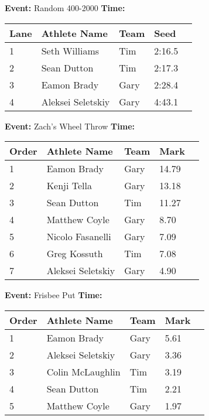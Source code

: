 \documentclass[10pt]{article}
\begin{document}
\textbf{Event:} Random 400-2000 \quad \textbf{Time:}  

\vspace{1em}
\begin{tabular}{@{}lllll@{}}
\toprule

\textbf{Lane} & \textbf{Athlete Name} & \textbf{Team} & \textbf{Seed} \\
\midrule
1 & Seth Williams & Tim & 2:16.5 &\\
2 & Sean Dutton & Tim & 2:17.3 &\\
3 & Eamon Brady & Gary & 2:28.4 &\\
4 & Aleksei Seletskiy & Gary & 4:43.1 &\\
\bottomrule
\end{tabular}
\vspace{2.5em}


\textbf{Event:} Zach's Wheel Throw \quad \textbf{Time:}  

\vspace{1em}
\begin{tabular}{@{}lllll@{}}
\toprule

\textbf{Order} & \textbf{Athlete Name} & \textbf{Team} & \textbf{Mark} \\
\midrule
1 & Eamon Brady & Gary & 14.79 &\\
2 & Kenji Tella & Gary & 13.18 &\\
3 & Sean Dutton & Tim & 11.27 &\\
4 & Matthew Coyle & Gary & 8.70 &\\
5 & Nicolo Fasanelli & Gary & 7.09 &\\
6 & Greg Kossuth & Tim & 7.08 &\\
7 & Aleksei Seletskiy & Gary & 4.90 &\\
\bottomrule
\end{tabular}
\vspace{2.5em}


\textbf{Event:} Frisbee Put \quad \textbf{Time:}  

\vspace{1em}
\begin{tabular}{@{}lllll@{}}
\toprule

\textbf{Order} & \textbf{Athlete Name} & \textbf{Team} & \textbf{Mark} \\
\midrule
1 & Eamon Brady & Gary & 5.61 &\\
2 & Aleksei Seletskiy & Gary & 3.36 &\\
3 & Colin McLaughlin & Tim & 3.19 &\\
4 & Sean Dutton & Tim & 2.21 &\\
5 & Matthew Coyle & Gary & 1.97 &\\
\bottomrule
\end{tabular}
\vspace{2.5em}
\end{document}
